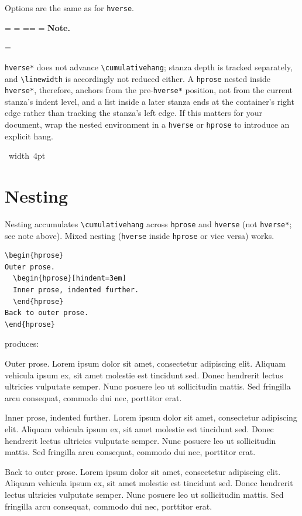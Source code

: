 \documentclass[11pt, twoside, openany]{article}
\makeatletter
\newcommand{\env}[1]{\texttt{#1}}
\newcommand{\cs}[1]{\texttt{\textbackslash #1}}
\newcommand*{\cns@tag@artifact@begin}{}
\newcommand*{\cns@tag@artifact@end}{}
\newenvironment{TodoNote}[1][]{%
  \par\addvspace{0.5\baselineskip plus 2pt}%
  \setbox\cns@box=\vbox\bgroup
    \hsize=\linewidth
    \advance\hsize -10pt
    \linewidth=\hsize \columnwidth=\hsize
    \parindent=\z@
    \noindent\textbf{\sffamily Note\cns@ifnotempty{#1}{ \textmd{(#1)}}.}%
    \par\nobreak
    \@afterindentfalse\@afterheading
    \leftskip=\cns@indent\relax
    \ignorespaces
}{%
  \par
  \egroup
  \vbox{\hbox{%
    \cns@tag@artifact@begin\vrule width 4pt\cns@tag@artifact@end
    \hskip 6pt\relax
    \box\cns@box
  }}%
  \par\addvspace{0.5\baselineskip plus 2pt}%
}
\makeatother
\begin{document}
Options are the same as for \env{hverse}.

\begin{TodoNote}
    \env{hverse*} does not advance \cs{cumulativehang}; stanza depth is tracked separately, and \cs{linewidth} is accordingly not reduced either. A \env{hprose} nested inside \env{hverse*}, therefore, anchors from the pre-\env{hverse*} position, not from the current stanza's indent level, and a list inside a later stanza ends at the container's right edge rather than tracking the stanza's left edge. If this matters for your document, wrap the nested environment in a \env{hverse} or \env{hprose} to introduce an explicit hang.
\end{TodoNote}


\section{Nesting}

Nesting accumulates \cs{cumulativehang} across \env{hprose} and \env{hverse} (not \env{hverse*}; see note above). Mixed nesting (\env{hverse} inside \env{hprose} or vice versa) works.

\begin{verbatim}
\begin{hprose}
Outer prose.
  \begin{hprose}[hindent=3em]
  Inner prose, indented further.
  \end{hprose}
Back to outer prose.
\end{hprose}
\end{verbatim}

\noindent produces:

\begin{hprose}
Outer prose. Lorem ipsum dolor sit amet, consectetur adipiscing elit. Aliquam vehicula ipsum ex, sit amet molestie est tincidunt sed. Donec hendrerit lectus ultricies vulputate semper. Nunc posuere leo ut sollicitudin mattis. Sed fringilla arcu consequat, commodo dui nec, porttitor erat.
\begin{hprose}[hindent=3em]
Inner prose, indented further. Lorem ipsum dolor sit amet, consectetur adipiscing elit. Aliquam vehicula ipsum ex, sit amet molestie est tincidunt sed. Donec hendrerit lectus ultricies vulputate semper. Nunc posuere leo ut sollicitudin mattis. Sed fringilla arcu consequat, commodo dui nec, porttitor erat.
\end{hprose}
Back to outer prose. Lorem ipsum dolor sit amet, consectetur adipiscing elit. Aliquam vehicula ipsum ex, sit amet molestie est tincidunt sed. Donec hendrerit lectus ultricies vulputate semper. Nunc posuere leo ut sollicitudin mattis. Sed fringilla arcu consequat, commodo dui nec, porttitor erat.
\end{hprose}
\end{document}
